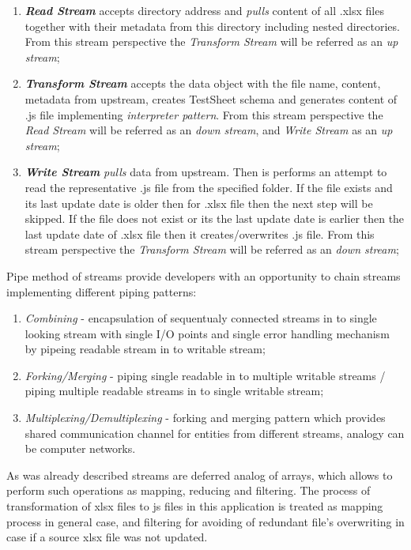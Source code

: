 \begin{enumerate}
	\item \textbf{\textit{Read Stream}} accepts directory address and \textit{pulls} content of all .xlsx files together with their metadata  from this directory including nested directories. From this stream perspective the \textit{Transform Stream} will be referred as an \textit{up stream};
	\item \textbf{\textit{Transform Stream}} accepts the data object with the file name, content, metadata from upstream, creates TestSheet schema and generates content of .js file implementing \textit{interpreter pattern}. From this stream perspective the \textit{Read Stream} will be referred as an \textit{down stream}, and \textit{Write Stream} as an \textit{up stream}; 
	\item \textbf{\textit{Write Stream}} \textit{pulls} data from upstream. Then is performs an attempt to read the representative .js file from the  specified folder. If the file exists and its last update date is older then for .xlsx file then the next step will be skipped. If the file does not exist or its the last update date is earlier then the last update date of .xlsx file then it creates/overwrites .js file. From this stream perspective the \textit{Transform Stream} will be referred as an \textit{down stream};
\end{enumerate}

Pipe method of streams provide developers with an opportunity to chain streams implementing different piping patterns:
\begin{enumerate}
	\item \textit{Combining} - encapsulation of sequentualy connected streams in to single looking stream with single I/O points and single error handling mechanism by pipeing readable stream in to writable stream;
	\item \textit{Forking/Merging} - piping single readable in to multiple writable streams /  piping multiple readable streams in to single writable stream;
	\item \textit{Multiplexing/Demultiplexing} - forking and merging pattern which provides shared communication channel for entities from different streams, analogy can be computer networks.
\end{enumerate}

As was already described streams are deferred analog of arrays, which allows to perform such operations as mapping, reducing and filtering. The process of transformation of xlsx files to js files in this application is treated as mapping process in general case, and filtering for avoiding of redundant file's overwriting in case if a source xlsx file was not updated.

